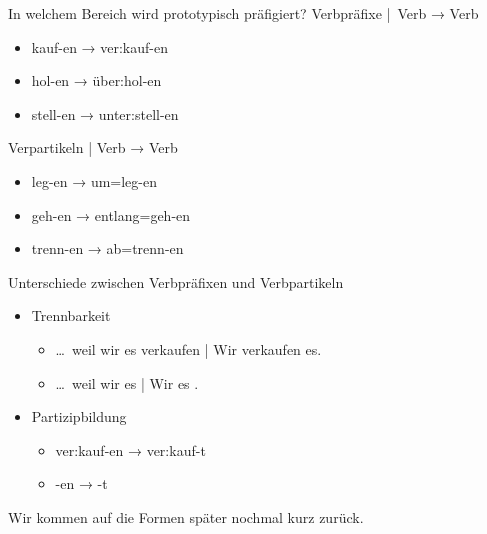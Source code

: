 \begin{frame}
  {In welchem Bereich wird prototypisch präfigiert?}
  \onslide<+->
  \onslide<+->
  \alert{Verbpräfixe} | Verb → Verb\\
  \Halbzeile
  \begin{itemize}[<+->]
    \item kauf-en → ver:kauf-en
    \item hol-en → über:hol-en
    \item stell-en → unter:stell-en
  \end{itemize}
  \Zeile
  \onslide<+->
  \alert{Verpartikeln} | Verb → Verb\\
  \Halbzeile
  \begin{itemize}[<+->]
    \item leg-en → um=leg-en
    \item geh-en → entlang=geh-en
    \item trenn-en → ab=trenn-en
  \end{itemize}
\end{frame}

\begin{frame}
  {Unterschiede zwischen Verbpräfixen und Verbpartikeln}
  \onslide<+->
  \begin{itemize}[<+->]
    \item Trennbarkeit
      \begin{itemize}[<+->]
        \item \ldots\ weil wir es \alert{verkaufen} | Wir \alert{verkaufen} es.
        \item \ldots\ weil wir es  | Wir  es .
      \end{itemize}
      \Zeile
    \item Partizipbildung
      \begin{itemize}[<+->]
        \item \alert{ver:kauf}-en → \alert{ver:kauf}-t
        \item {}-en → -t
      \end{itemize}
  \end{itemize}
  \onslide<+->

  \Zeile
  \centering 
  Wir kommen auf die Formen später nochmal kurz zurück.
\end{frame}

